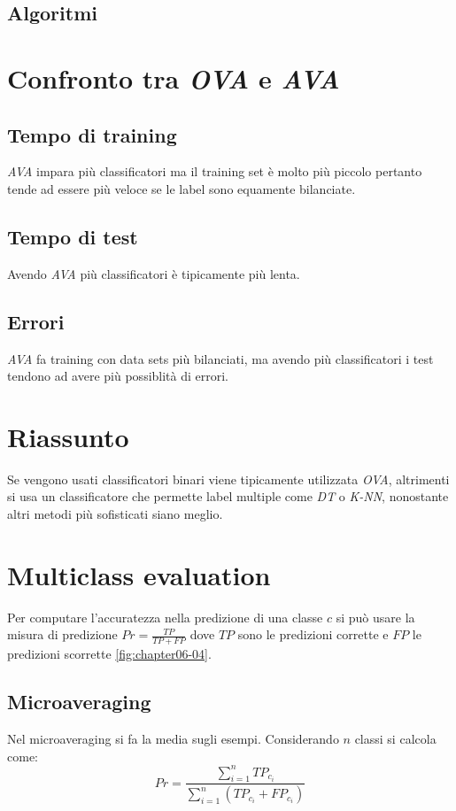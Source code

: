 	\subsection{Algoritmi}
	
	

\section{Confronto tra \emph{OVA} e \emph{AVA}}

	\subsection{Tempo di training}
	\emph{AVA} impara pi\`u classificatori ma il training set \`e molto pi\`u piccolo pertanto tende ad essere pi\`u veloce se le label sono equamente bilanciate.

	\subsection{Tempo di test}
	Avendo \emph{AVA} pi\`u classificatori \`e tipicamente pi\`u lenta.

	\subsection{Errori}
	\emph{AVA} fa training con data sets pi\`u bilanciati, ma avendo pi\`u classificatori i test tendono ad avere pi\`u possiblit\`a di errori.

\section{Riassunto}
Se vengono usati classificatori binari viene tipicamente utilizzata  \emph{OVA}, altrimenti si usa un classificatore che permette label multiple come \emph{DT} o \emph{K-NN}, nonostante altri metodi pi\`u sofisticati siano meglio.

\section{Multiclass evaluation}
Per computare l'accuratezza nella predizione di una classe $c$ si pu\`o usare la misura di predizione $Pr=\frac{TP}{TP+FP}$ dove $TP$ sono le predizioni corrette e $FP$ le predizioni scorrette \ref{fig:chapter06-04}.

	\subsection{Microaveraging}
	Nel microaveraging si fa la media sugli esempi.
	Considerando $n$ classi si calcola come:
	$$Pr=\dfrac{\sum\limits_{i=1}^nTP_{c_i}}{\sum\limits_{i=1}^n(TP_{c_i}+FP_{c_i})}$$

